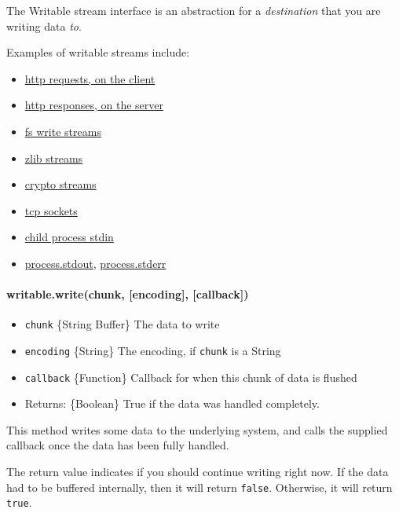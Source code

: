 The Writable stream interface is an abstraction for a \emph{destination}
that you are writing data \emph{to}.

Examples of writable streams include:

\begin{itemize}
\itemsep1pt\parskip0pt
\item
  \href{http.html\#http_class_http_clientrequest}{http requests, on the
  client}
\item
  \href{http.html\#http_class_http_serverresponse}{http responses, on
  the server}
\item
  \href{fs.html\#fs_class_fs_writestream}{fs write streams}
\item
  \href{zlib.html}{zlib streams}
\item
  \href{crypto.html}{crypto streams}
\item
  \href{net.html\#net_class_net_socket}{tcp sockets}
\item
  \href{child_process.html\#child_process_child_stdin}{child process
  stdin}
\item
  \href{process.html\#process_process_stdout}{process.stdout},
  \href{process.html\#process_process_stderr}{process.stderr}
\end{itemize}

\paragraph{writable.write(chunk, {[}encoding{]},
{[}callback{]})}\label{writable.writechunk-encoding-callback}

\begin{itemize}
\itemsep1pt\parskip0pt
\item
  \texttt{chunk} \{String \textbar{} Buffer\} The data to write
\item
  \texttt{encoding} \{String\} The encoding, if \texttt{chunk} is a
  String
\item
  \texttt{callback} \{Function\} Callback for when this chunk of data is
  flushed
\item
  Returns: \{Boolean\} True if the data was handled completely.
\end{itemize}

This method writes some data to the underlying system, and calls the
supplied callback once the data has been fully handled.

The return value indicates if you should continue writing right now. If
the data had to be buffered internally, then it will return
\texttt{false}. Otherwise, it will return \texttt{true}.

